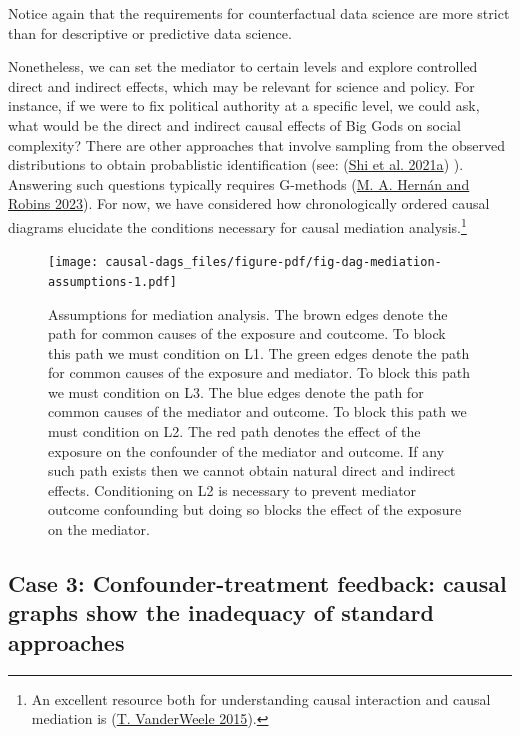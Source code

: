 \documentclass[
  singlecolumn]{report}
\begin{document}
Notice again that the requirements for counterfactual data science are
more strict than for descriptive or predictive data science.

Nonetheless, we can set the mediator to certain levels and explore
controlled direct and indirect effects, which may be relevant for
science and policy. For instance, if we were to fix political authority
at a specific level, we could ask, what would be the direct and indirect
causal effects of Big Gods on social complexity? There are other
approaches that involve sampling from the observed distributions to
obtain probablistic identification (see:
(\protect\hyperlink{ref-shi2021}{Shi et al. 2021a}) ). Answering such
questions typically requires G-methods
(\protect\hyperlink{ref-hernuxe1n2023a}{M. A. Hernán and Robins 2023}).
For now, we have considered how chronologically ordered causal diagrams
elucidate the conditions necessary for causal mediation
analysis.\footnote{An excellent resource both for understanding causal
  interaction and causal mediation is
  (\protect\hyperlink{ref-vanderweele2015}{T. VanderWeele 2015}).}

\begin{figure}

{\centering \texttt{[image: causal-dags\_files/figure-pdf/fig-dag-mediation-assumptions-1.pdf]}

}

\caption{\label{fig-dag-mediation-assumptions}Assumptions for mediation
analysis. The brown edges denote the path for common causes of the
exposure and coutcome. To block this path we must condition on L1. The
green edges denote the path for common causes of the exposure and
mediator. To block this path we must condition on L3. The blue edges
denote the path for common causes of the mediator and outcome. To block
this path we must condition on L2. The red path denotes the effect of
the exposure on the confounder of the mediator and outcome. If any such
path exists then we cannot obtain natural direct and indirect effects.
Conditioning on L2 is necessary to prevent mediator outcome confounding
but doing so blocks the effect of the exposure on the mediator.}

\end{figure}

\hypertarget{case-3-confounder-treatment-feedback-causal-graphs-show-the-inadequacy-of-standard-approaches}{%
\subsection{Case 3: Confounder-treatment feedback: causal graphs show
the inadequacy of standard
approaches}\label{case-3-confounder-treatment-feedback-causal-graphs-show-the-inadequacy-of-standard-approaches}}
\end{document}
